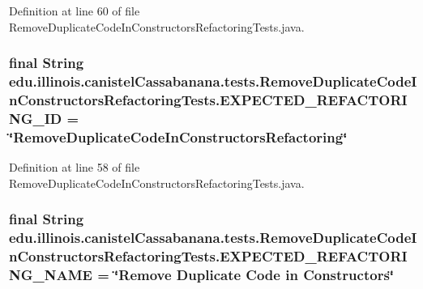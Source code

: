 Definition at line 60 of file RemoveDuplicateCodeInConstructorsRefactoringTests.java.

\hypertarget{classedu_1_1illinois_1_1canistelCassabanana_1_1tests_1_1RemoveDuplicateCodeInConstructorsRefactoringTests_afaed708bee891f511d416153a09b2822}{
\subsubsection[{EXPECTED\_\-REFACTORING\_\-ID}]{\setlength{\rightskip}{0pt plus 5cm}final String {\bf edu.illinois.canistelCassabanana.tests.RemoveDuplicateCodeInConstructorsRefactoringTests.EXPECTED\_\-REFACTORING\_\-ID} = \char`\"{}RemoveDuplicateCodeInConstructorsRefactoring\char`\"{}}}
\label{classedu_1_1illinois_1_1canistelCassabanana_1_1tests_1_1RemoveDuplicateCodeInConstructorsRefactoringTests_afaed708bee891f511d416153a09b2822}


Definition at line 58 of file RemoveDuplicateCodeInConstructorsRefactoringTests.java.

\hypertarget{classedu_1_1illinois_1_1canistelCassabanana_1_1tests_1_1RemoveDuplicateCodeInConstructorsRefactoringTests_a6731732fcf429dca7528f1b1e9327d96}{
\subsubsection[{EXPECTED\_\-REFACTORING\_\-NAME}]{\setlength{\rightskip}{0pt plus 5cm}final String {\bf edu.illinois.canistelCassabanana.tests.RemoveDuplicateCodeInConstructorsRefactoringTests.EXPECTED\_\-REFACTORING\_\-NAME} = \char`\"{}Remove Duplicate Code in Constructors\char`\"{}}}
\label{classedu_1_1illinois_1_1canistelCassabanana_1_1tests_1_1RemoveDuplicateCodeInConstructorsRefactoringTests_a6731732fcf429dca7528f1b1e9327d96}


